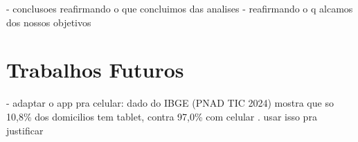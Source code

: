 - conclusoes reafirmando o que concluimos das analises
- reafirmando o q alcamos dos nossos objetivos
\section{Trabalhos Futuros}
    
- adaptar o app pra celular: dado do IBGE (PNAD TIC 2024) mostra que so 10,8\% dos domicilios tem tablet, contra 97,0\% com celular \cite{ibge2025tic}. usar isso pra justificar
